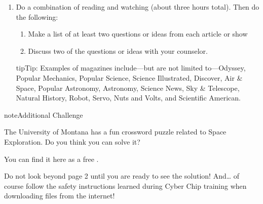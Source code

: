 \documentclass[letterpaper,10pt,english,openany,oneside]{sphinxmanual}
\begin{document}
\begin{description}
\begin{enumerate}
\begin{enumerate}
\item {} 
Discuss two of the questions or ideas with your counselor

\end{enumerate}

\begin{sphinxadmonition}{tip}{Tip:}
Examples of magazines include—but are not limited to—Odyssey, Popular Mechanics, Popular Science, Science Illustrated, Discover, Air \& Space, Popular Astronomy, Astronomy, Science News, Sky \& Telescope, Natural History, Robot, Servo, Nuts and Volts, and Scientific American.
\end{sphinxadmonition}

\item {} 
Do a combination of reading and watching (about three hours total). Then do the following:
\begin{enumerate}
%
\item {} 
Make a list of at least two questions or ideas from each article or show

\item {} 
Discuss two of the questions or ideas with your counselor.

\end{enumerate}

\begin{sphinxadmonition}{tip}{Tip:}
Examples of magazines include—but are not limited to—Odyssey, Popular Mechanics, Popular Science, Science Illustrated, Discover, Air \& Space, Popular Astronomy, Astronomy, Science News, Sky \& Telescope, Natural History, Robot, Servo, Nuts and Volts, and Scientific American.
\end{sphinxadmonition}

\end{enumerate}

\end{description}

\begin{sphinxadmonition}{note}{Additional Challenge}

The University of Montana has a fun crossword puzzle related to Space Exploration. Do you think you can solve it?

You can find it here as a free .

Do not look beyond page 2 until you are ready to see the solution! And… of course follow the safety instructions learned during Cyber Chip training when downloading files from the internet!
\end{sphinxadmonition}
\end{document}
